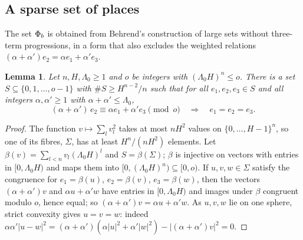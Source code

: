 \documentclass[10pt]{amsart}
\newtheorem{lemma}[theorem]{Lemma}
\theoremstyle{definition}
\theoremstyle{remark}
\begin{document}
\subsection{A sparse set of places}\label{an:ssec-sparse}
The set $\Phi_b$ is obtained from Behrend's construction \cite{Behrend1946} of
large sets without three-term progressions, in a form that also excludes the
weighted relations $(\alpha+\alpha')e_2=\alpha e_1+\alpha'e_3$.

\begin{lemma}\label{an:lem-behrend}
Let $n,H,\Lambda_0\ge1$ and $o$ be integers with $(\Lambda_0H)^{n}\le o$.
There is a set $S\subseteq\{0,1,\dots,o-1\}$ with $\#S\ge H^{n-2}/n$ such
that for all $e_1,e_2,e_3\in S$ and all integers $\alpha,\alpha'\ge1$ with
$\alpha+\alpha'\le\Lambda_0$,
\[
 (\alpha+\alpha')\,e_2\equiv\alpha e_1+\alpha'e_3\pmod o\quad\Longrightarrow\quad e_1=e_2=e_3 .
\]
\end{lemma}
\begin{proof}
The function $v\mapsto\sum_lv_l^2$ takes at most $nH^{2}$ values on
$\{0,\dots,H-1\}^{n}$, so one of its fibres, $\Sigma$, has at least
$H^{n}/(nH^{2})$ elements. Let $\beta(v)=\sum_{l<n}v_l(\Lambda_0H)^{l}$ and
$S=\beta(\Sigma)$; $\beta$ is injective on vectors with entries in
$[0,\Lambda_0H)$ and maps them into $[0,(\Lambda_0H)^{n})\subseteq[0,o)$. If
$u,v,w\in\Sigma$ satisfy the congruence for $e_1=\beta(u)$, $e_2=\beta(v)$,
$e_3=\beta(w)$, then the vectors $(\alpha+\alpha')v$ and
$\alpha u+\alpha'w$ have entries in $[0,\Lambda_0H)$ and images under $\beta$
congruent modulo $o$, hence equal; so
$(\alpha+\alpha')v=\alpha u+\alpha'w$. As $u,v,w$ lie on one sphere, strict
convexity gives $u=v=w$: indeed
$\alpha\alpha'|u-w|^2=(\alpha+\alpha')(\alpha|u|^2+\alpha'|w|^2)-|(\alpha+\alpha')v|^2=0$.
\end{proof}
\end{document}
